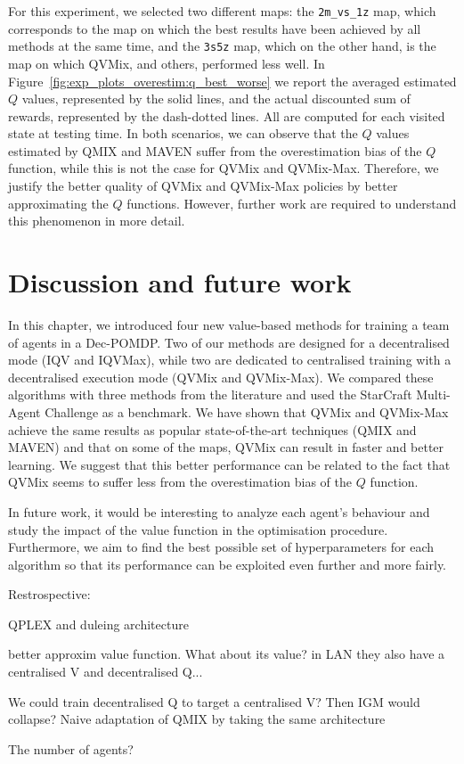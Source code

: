 For this experiment, we selected two different maps: the \texttt{2m\_vs\_1z} map, which corresponds to the map on which the best results have been achieved by all methods at the same time, and the \texttt{3s5z} map, which on the other hand, is the map on which QVMix, and others, performed less well.
In Figure~\ref{fig:exp_plots_overestim:q_best_worse} we report the averaged estimated $Q$ values, represented by the solid lines, and the actual discounted sum of rewards, represented by the dash-dotted lines.
All are computed for each visited state at testing time.
In both scenarios, we can observe that the $Q$ values estimated by QMIX and MAVEN suffer from the overestimation bias of the $Q$ function, while this is not the case for QVMix and QVMix-Max.
Therefore, we justify the better quality of QVMix and QVMix-Max policies by better approximating the $Q$ functions.
However, further work are required to understand this phenomenon in more detail.

\section{Discussion and future work} \label{sec:ch4_conclusion}

In this chapter, we introduced four new value-based methods for training a team of agents in a Dec-POMDP.
Two of our methods are designed for a decentralised mode (IQV and IQVMax), while two are dedicated to centralised training with a decentralised execution mode (QVMix and QVMix-Max).
We compared these algorithms with three methods from the literature and used the StarCraft Multi-Agent Challenge as a benchmark. 
We have shown that QVMix and QVMix-Max achieve the same results as popular state-of-the-art techniques (QMIX and MAVEN) and that on some of the maps, QVMix can result in faster and better learning.
We suggest that this better performance can be related to the fact that QVMix seems to suffer less from the overestimation bias of the $Q$ function.

In future work, it would be interesting to analyze each agent's behaviour and study the impact of the value function in the optimisation procedure.
Furthermore, we aim to find the best possible set of hyperparameters for each algorithm so that its performance can be exploited even further and more fairly.

Restrospective:

QPLEX and duleing architecture

better approxim value function. What about its value? in LAN they also have a centralised V and decentralised Q...

We could train decentralised Q to target a centralised V? Then IGM would collapse?
Naive adaptation of QMIX by taking the same architecture

The number of agents?